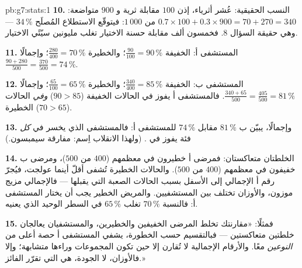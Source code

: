 \begin{solution}{pb:g7:stats:1}
\textbf{10.} النسب الحقيقية: عُشر أثرياء، إذن $100$
مقابلة ثرية و $900$ متواضعة:
$0.7 \times 100 + 0.3 \times 900 = 70 + 270 = 340$ من
$1\,000$: فيتوقّع الاستطلاع المُصلَح $34\,\%$ --- وهي حقيقة
السؤال 8. فخمسون ألف مقابلة حسنة الاختيار تغلب مليونين
سيّئَي الاختيار.

\textbf{11.} المستشفى أ: الخفيفة $\frac{90}{100} = 90\,\%$؛ والخطيرة
$\frac{280}{400} = 70\,\%$؛ وإجمالًا
$\frac{90 + 280}{500} = \frac{370}{500} = 74\,\%$.

\textbf{12.} المستشفى ب: الخفيفة $\frac{340}{400} = 85\,\%$؛
والخطيرة $\frac{65}{100} = 65\,\%$؛ وإجمالًا
$\frac{340 + 65}{500} = \frac{405}{500} = 81\,\%$. فالمستشفى أ
يفوز في الحالات الخفيفة ($90 > 85$) \emph{وفي} الحالات الخطيرة
($70 > 65$).

\textbf{13.} وإجمالًا، يبيّن ب $81\,\%$ مقابل $74\,\%$ للمستشفى أ:
فالمستشفى الذي يخسر في \emph{كل} فئة يفوز في
. (ولهذا الانقلاب اِسم: مفارقة سيمبسون.)

\textbf{14.} الخلطتان متعاكستان: فمرضى أ خطيرون في
معظمهم ($400$ من $500$)، ومرضى ب خفيفون في معظمهم ($400$ من $500$).
والحالات الخطيرة تُشفى أقلّ أينما عولجت، فيُجرّ رقم أ
الإجمالي إلى الأسفل بسبب الحالات الصعبة التي يقبلها ---
فالإجمالي مزيج موزون، والأوزان تختلف بين
المستشفيين. والمريض الخطير يجب أن يختار المستشفى أ: فالنسبة $70\,\%$
تغلب $65\,\%$ في السطر الوحيد الذي يعنيه.

\textbf{15.} فمثلًا: «مقارنتك تخلط المرضى الخفيفين
والخطيرين، والمستشفيان يعالجان خلطتين متعاكستين ---
فبالتقسيم حسب الخطورة، يشفي المستشفى أ حصة أعلى من
\emph{النوعين} معًا. والأرقام الإجمالية لا تُقارن إلا حين تكون
المجموعات وراءها متشابهة؛ وإلا فالأوزان، لا
الجودة، هي التي تقرّر الفائز.»
\end{solution}
